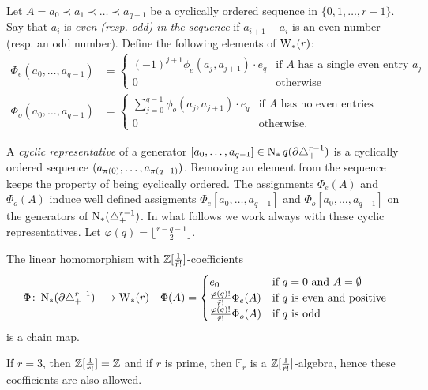 Let $A= a_0\prec a_1\prec\ldots\prec a_{q-1}$ be a cyclically ordered sequence in $\{0,1,\ldots,r-1\}$. Say that $a_i$ is \emph{even (resp. \emph{odd}) in the sequence} if $a_{i+1}-a_i$ is an even number (resp. an odd number).
Define the following elements of $\operatorname{W}_{*}(r)$:
\begin{align*}
	\Phi_e(a_0,\ldots,a_{q-1}) &= \begin{cases}
		(-1)^{j+1}\phi_e(a_j,a_{j+1})\cdot e_q & \text{if $A$ has a single even entry $a_j$} \\
		0 & \text{otherwise}
	\end{cases}
	\\
	\Phi_o(a_0,\ldots,a_{q-1}) &= \begin{cases}
		\sum_{j=0}^{q-1} \phi_o(a_j,a_{j+1})\cdot e_q & \text{if $A$ has no even entries} \\
		0 & \text{otherwise.}
	\end{cases}
\end{align*}

A \emph{cyclic representative} of a generator $[a_0,\ldots,a_{q-1}]\in \operatorname{N}_{*}{q}(\partial \triangle_{+}^{r-1})$ is a cyclically ordered sequence $(a_{\pi(0)},\ldots,a_{\pi(q-1)})$. Removing an element from the sequence keeps the property of being cyclically ordered. The assignments $\Phi_e(A)$ and $\Phi_o(A)$ induce well defined assigments $\Phi_e[a_0,\ldots,a_{q-1}]$ and $\Phi_o[a_0,\ldots,a_{q-1}]$ on the generators of $\operatorname{N}_{*}(\triangle_{+}^{r-1})$. In what follows we work always with these cyclic representatives. Let $\varphi(q) = \lfloor\frac{r-q-1}{2}\rfloor$.
\begin{theorem} The linear homomorphism with $\mathbb{Z}[\frac{1}{\tilde{r}!}]$-coefficients
	\begin{align*}
		\Phi\colon \operatorname{N}_{*}(\partial \triangle_{+}^{r-1})&\longrightarrow \operatorname{W}_{*}(r)
		&
		\Phi(A) = \begin{cases}
			e_0 & \text{if $q=0$ and $A = \emptyset$}\\
			\frac{\varphi(q)!}{\tilde{r}!}\Phi_e(A) & \text{if $q$ is even and positive} \\
			\frac{\varphi(q)!}{\tilde{r}!}\Phi_o(A) & \text{if $q$ is odd}
		\end{cases}
	\end{align*}
	is a chain map.
\end{theorem}

\begin{remark}
	If $r=3$, then $\mathbb{Z}[\frac{1}{\tilde{r}!}] = \mathbb{Z}$ and if $r$ is prime, then $\mathbb{F}_r$ is a $\mathbb{Z}[\frac{1}{\tilde{r}!}]$-algebra, hence these coefficients are also allowed.
\end{remark}

